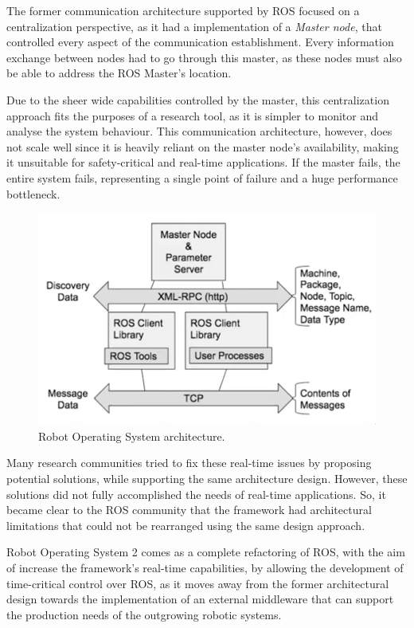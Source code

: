 The former communication architecture supported by ROS focused on a centralization perspective, as it had a implementation of a \textit{Master node}, that controlled every aspect of the communication establishment. Every information exchange between nodes had to go through this master, as these nodes must also be able to address the ROS Master's location.

Due to the sheer wide capabilities controlled by the master, this centralization approach fits the purposes of a research tool, as it is simpler to monitor and analyse the system behaviour. This communication architecture, however, does not scale well since it is heavily reliant on the master node's availability, making it unsuitable for safety-critical and real-time applications. If the master fails, the entire system fails, representing a single point of failure and a huge performance bottleneck.

\begin{figure}[H]
  \centering
  \includegraphics[width=0.6\linewidth]{images/former-ros1-architecture.png}
  \caption{Robot Operating System architecture.}
  \label{fig:ros1-architecture}
\end{figure}

Many research communities tried to fix these real-time issues by proposing potential solutions, while supporting the same architecture design. However, these solutions did not fully accomplished the needs of real-time applications. So, it became clear to the ROS community that the framework had architectural limitations that could not be rearranged using the same design approach. \cite{maruyama2016exploring}

Robot Operating System 2 comes as a complete refactoring of ROS, with the aim of increase the framework's real-time capabilities, by allowing the development of time-critical control over ROS, as it moves away from the former architectural design towards the implementation of an external middleware that can support the production needs of the outgrowing robotic systems. \cite{kim2018security, casini2019response}

